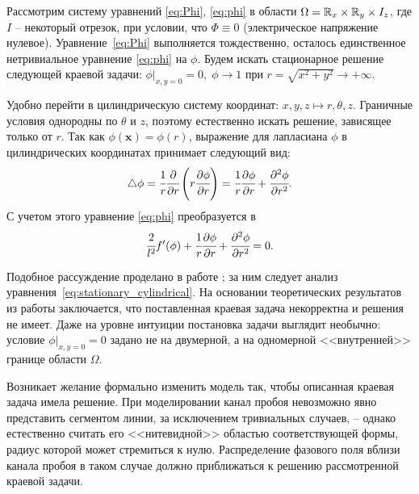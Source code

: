 Рассмотрим систему уравнений \eqref{eq:Phi}, \eqref{eq:phi} в области $\Omega = {\mathbb{R}}_x \times {\mathbb{R}}_y \times I_z$, где $I$ -- некоторый отрезок, при условии, что $\Phi \equiv 0$ (электрическое напряжение нулевое). Уравнение~\eqref{eq:Phi} выполняется тождественно, осталось единственное нетривиальное уравнение \eqref{eq:phi} на $\phi$. Будем искать стационарное решение следующей краевой задачи: $\phi|_{x, y = 0} = 0, \; \phi \to 1$ при $r = \sqrt{x^2 + y^2} \to +\infty$.

Удобно перейти в цилиндрическую систему координат: $x, y, z \longmapsto r, \theta, z$. Граничные условия однородны по $\theta$ и $z$, поэтому естественно искать решение, зависящее только от $r$. Так как $\phi(\mathbf{x}) = \phi(r)$, выражение для лапласиана $\phi$ в цилиндрических координатах принимает следующий вид:
$$\triangle \phi = \cfrac{1}{r} \cfrac{\partial}{\partial r} \left( r \cfrac{\partial \phi}{\partial r} \right) = \cfrac{1}{r} \cfrac{\partial \phi}{\partial r} + \cfrac{\partial ^2 \phi}{\partial r^2} {\text{.}}$$
С учетом этого уравнение \eqref{eq:phi} преобразуется в
\begin{equation}
    \cfrac{2}{l^2} f'(\phi) + \cfrac{1}{r} \cfrac{\partial \phi}{\partial r} + \cfrac{\partial ^2 \phi}{\partial r^2} = 0 {\text{.}}
    \label{eq:stationary_cylindrical}
\end{equation}

Подобное рассуждение проделано в работе \cite{zipunova_higher_codimension}; за ним следует анализ уравнения~\eqref{eq:stationary_cylindrical}. На основании теоретических результатов из работы \cite{cirstea_elliptic_equations} заключается, что поставленная краевая задача некорректна и решения не имеет. Даже на уровне интуиции постановка задачи выглядит необычно: условие $\phi|_{x, y = 0} = 0$ задано не на двумерной, а на одномерной <<внутренней>> границе области $\Omega$.

Возникает желание формально изменить модель так, чтобы описанная краевая задача имела решение. При моделировании канал пробоя невозможно явно представить сегментом линии, за исключением тривиальных случаев, -- однако естественно считать его <<нитевидной>> областью соответствующей формы, радиус которой может стремиться к нулю. Распределение фазового поля вблизи канала пробоя в таком случае должно приближаться к решению рассмотренной краевой задачи.
